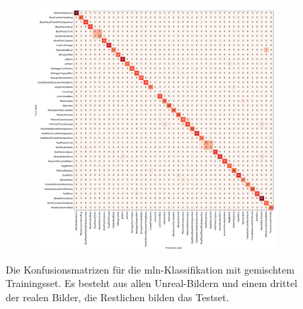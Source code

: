 \begin{figure}
\begin{subfigure}[b]{1\textwidth}
	\includegraphics[scale=.29]{img/chapter6/UnrealRealMixedGTInstance.png}
	\end{subfigure}
\caption[Die Konfusionsmatrizen der Klassifikation mit gemischtem Trainingsset und realem Testset]{Die Konfusionsmatrizen für die \gls{mln}-Klassifikation mit gemischtem Trainingsset. Es besteht aus allen Unreal-Bildern und einem drittel der realen Bilder, die Restlichen bilden das Testset.}
\label{fig:UnrealRealMixed_confMatrices}
\end{figure}


